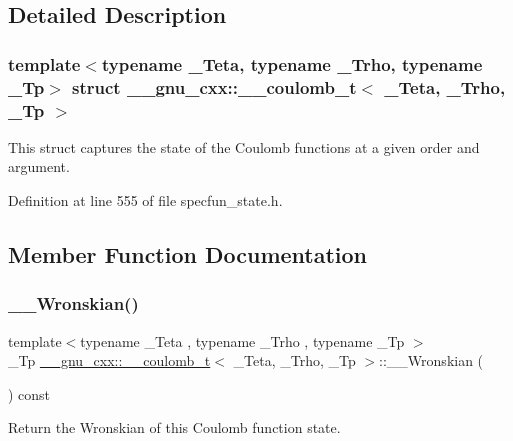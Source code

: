 \subsection{Detailed Description}
\subsubsection*{template$<$typename \+\_\+\+Teta, typename \+\_\+\+Trho, typename \+\_\+\+Tp$>$\newline
struct \+\_\+\+\_\+gnu\+\_\+cxx\+::\+\_\+\+\_\+coulomb\+\_\+t$<$ \+\_\+\+Teta, \+\_\+\+Trho, \+\_\+\+Tp $>$}

This struct captures the state of the Coulomb functions at a given order and argument. 

Definition at line 555 of file specfun\+\_\+state.\+h.



\subsection{Member Function Documentation}
\mbox{\label{struct____gnu__cxx_1_1____coulomb__t_a94a8dbe4756e2b8b7241d5a66c6e6b3d}} 
\subsubsection{\texorpdfstring{\+\_\+\+\_\+\+Wronskian()}{\_\_Wronskian()}}
{\footnotesize\ttfamily template$<$typename \+\_\+\+Teta , typename \+\_\+\+Trho , typename \+\_\+\+Tp $>$ \\
\+\_\+\+Tp \hyperlink{struct____gnu__cxx_1_1____coulomb__t}{\+\_\+\+\_\+gnu\+\_\+cxx\+::\+\_\+\+\_\+coulomb\+\_\+t}$<$ \+\_\+\+Teta, \+\_\+\+Trho, \+\_\+\+Tp $>$\+::\+\_\+\+\_\+\+Wronskian (\begin{DoxyParamCaption}{ }\end{DoxyParamCaption}) const\hspace{0.3cm}{\ttfamily [inline]}}



Return the Wronskian of this Coulomb function state. 




